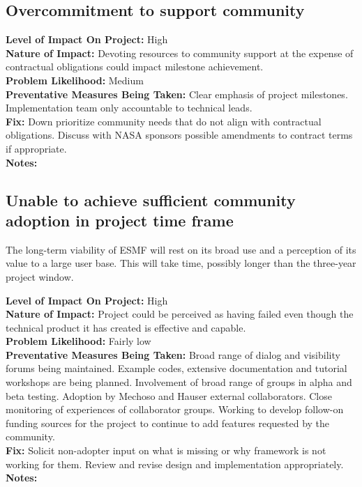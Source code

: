 \documentclass[english]{article}
\newcommand{\sreq}[1]{\subsection{\hspace{.2in}#1}}
\newenvironment
{reqlist}
{\begin{list} {} {} \rm \item[]}
{\end{list}}
\begin{document}
\sreq{Overcommitment to support community}
\begin{reqlist}
{\bf Level of Impact On Project:} High \\
{\bf Nature of Impact:} Devoting resources to community support at the expense of contractual obligations
could impact milestone achievement.\\
{\bf Problem Likelihood:} Medium \\
{\bf Preventative Measures Being Taken:} Clear emphasis of project milestones. Implementation
team only accountable to technical leads.\\
{\bf Fix:} Down prioritize community needs that do not align with contractual obligations.
Discuss with NASA sponsors possible amendments to contract terms if appropriate.\\
{\bf Notes:} \\
\end{reqlist}

\sreq{Unable to achieve sufficient community adoption in project time frame}
The long-term viability of ESMF will rest on its broad use and a perception of
its value to a large user base. This will take time, possibly longer
than the three-year project window.
\begin{reqlist}
{\bf Level of Impact On Project:}  High \\
{\bf Nature of Impact:} Project could be perceived as having failed even though the
technical product it has created is effective and capable.\\
{\bf Problem Likelihood:} Fairly low \\
{\bf Preventative Measures Being Taken:} Broad range of dialog and visibility 
forums being maintained. Example codes, extensive documentation and tutorial
workshops are being planned. Involvement of broad range of groups in alpha and
beta testing. Adoption by Mechoso and Hauser external collaborators.
Close monitoring of experiences of collaborator groups.  
Working to develop follow-on funding sources for the project to continue
to add features requested by the community.
\\
{\bf Fix:} Solicit non-adopter input on what is missing or why framework is not working for them.
Review and revise design and implementation appropriately.\\
{\bf Notes:} \\
\end{reqlist}
\end{document}
